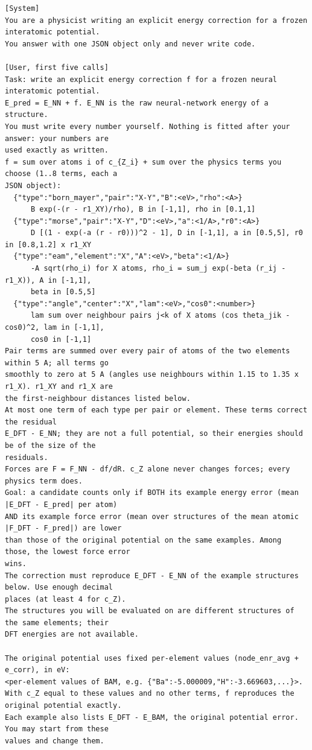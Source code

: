 \begin{scriptsize}
\begin{verbatim}
[System]
You are a physicist writing an explicit energy correction for a frozen interatomic potential.
You answer with one JSON object only and never write code.

[User, first five calls]
Task: write an explicit energy correction f for a frozen neural interatomic potential.
E_pred = E_NN + f. E_NN is the raw neural-network energy of a structure.
You must write every number yourself. Nothing is fitted after your answer: your numbers are
used exactly as written.
f = sum over atoms i of c_{Z_i} + sum over the physics terms you choose (1..8 terms, each a
JSON object):
  {"type":"born_mayer","pair":"X-Y","B":<eV>,"rho":<A>}
      B exp(-(r - r1_XY)/rho), B in [-1,1], rho in [0.1,1]
  {"type":"morse","pair":"X-Y","D":<eV>,"a":<1/A>,"r0":<A>}
      D [(1 - exp(-a (r - r0)))^2 - 1], D in [-1,1], a in [0.5,5], r0 in [0.8,1.2] x r1_XY
  {"type":"eam","element":"X","A":<eV>,"beta":<1/A>}
      -A sqrt(rho_i) for X atoms, rho_i = sum_j exp(-beta (r_ij - r1_X)), A in [-1,1],
      beta in [0.5,5]
  {"type":"angle","center":"X","lam":<eV>,"cos0":<number>}
      lam sum over neighbour pairs j<k of X atoms (cos theta_jik - cos0)^2, lam in [-1,1],
      cos0 in [-1,1]
Pair terms are summed over every pair of atoms of the two elements within 5 A; all terms go
smoothly to zero at 5 A (angles use neighbours within 1.15 to 1.35 x r1_X). r1_XY and r1_X are
the first-neighbour distances listed below.
At most one term of each type per pair or element. These terms correct the residual
E_DFT - E_NN; they are not a full potential, so their energies should be of the size of the
residuals.
Forces are F = F_NN - df/dR. c_Z alone never changes forces; every physics term does.
Goal: a candidate counts only if BOTH its example energy error (mean |E_DFT - E_pred| per atom)
AND its example force error (mean over structures of the mean atomic |F_DFT - F_pred|) are lower
than those of the original potential on the same examples. Among those, the lowest force error
wins.
The correction must reproduce E_DFT - E_NN of the example structures below. Use enough decimal
places (at least 4 for c_Z).
The structures you will be evaluated on are different structures of the same elements; their
DFT energies are not available.

The original potential uses fixed per-element values (node_enr_avg + e_corr), in eV:
<per-element values of BAM, e.g. {"Ba":-5.000009,"H":-3.669603,...}>.
With c_Z equal to these values and no other terms, f reproduces the original potential exactly.
Each example also lists E_DFT - E_BAM, the original potential error. You may start from these
values and change them.


\end{verbatim}
\end{scriptsize}
